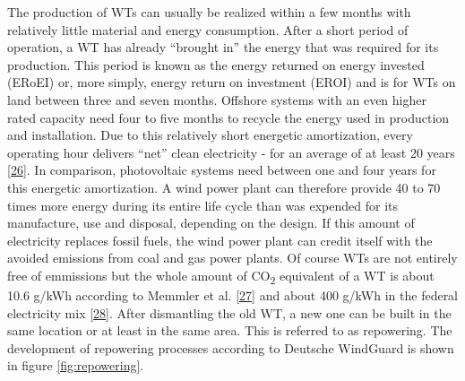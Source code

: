 \documentclass[a4paper,11pt]{article}
\begin{document}
The production of WTs can usually be realized within a few months with relatively little material and energy consumption. After a short period of operation, a WT has already ``brought in'' the energy that was required for its production. This period is known as the energy returned on energy invested (ERoEI) or, more simply, energy return on investment (EROI) and is for WTs on land between three and seven months. Offshore systems with an even higher rated capacity need four to five months to recycle the energy used in production and installation. Due to this relatively short energetic amortization, every operating hour delivers ``net'' clean electricity - for an average of at least 20 years {[}\protect\hyperlink{ref-PriyanaRazdan.2019}{26}{]}. In comparison, photovoltaic systems need between one and four years for this energetic amortization. A wind power plant can therefore provide 40 to 70 times more energy during its entire life cycle than was expended for its manufacture, use and disposal, depending on the design. If this amount of electricity replaces fossil fuels, the wind power plant can credit itself with the avoided emissions from coal and gas power plants. Of course WTs are not entirely free of emmissions but the whole amount of CO\textsubscript{2} equivalent of a WT is about 10.6 g/kWh according to Memmler et al. {[}\protect\hyperlink{ref-M.MemmlerDr.T.LaufS.Schneider.2017}{27}{]} and about 400 g/kWh in the federal electricity mix {[}\protect\hyperlink{ref-Umweltbundesamt.2021}{28}{]}. After dismantling the old WT, a new one can be built in the same location or at least in the same area. This is referred to as repowering. The development of repowering processes according to Deutsche WindGuard is shown in figure \ref{fig:repowering}.
\end{document}
